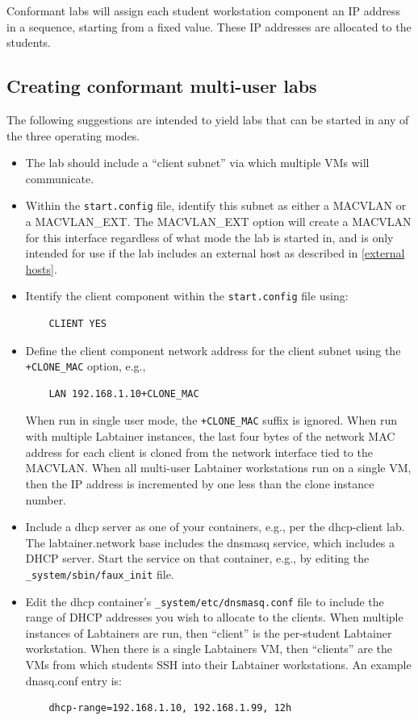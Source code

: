 \documentclass[12pt]{article}
\begin{document}
Conformant labs will assign each student workstation component an IP address in a sequence,
starting from a fixed value.  These IP addresses are allocated to the students.

\subsection{Creating conformant multi-user labs}
\label{conformant multi-user}
The following suggestions are intended to yield labs that can be started in any of
the three operating modes.

\begin{itemize}
\item The lab should include a ``client subnet'' via which multiple VMs will communicate.

\item Within the {\tt start.config} file, identify this subnet as either a MACVLAN or
a MACVLAN\_EXT.  The MACVLAN\_EXT
option will create a MACVLAN for this interface regardless of what mode the lab is started in,
and is only intended for use if the lab includes an external host as described in \ref{external hosts}.

\item Itentify the client component within the {\tt start.config} file using:
\begin{verbatim}
    CLIENT YES
\end{verbatim}

\item Define the client component network address for the client subnet using the
{\tt +CLONE\_MAC} option, e.g., 
\begin{verbatim}
    LAN 192.168.1.10+CLONE_MAC
\end{verbatim}
\noindent  When run in single user mode, the {\tt +CLONE\_MAC} suffix is ignored.  When run
with multiple Labtainer instances, the last four bytes of the network MAC address for
each client is cloned from the network interface tied to the MACVLAN.  When all multi-user
Labtainer workstations run on a single VM, then the IP address is incremented by one less
than the clone instance number.

\item Include a dhcp server as one of your containers, e.g., per the dhcp-client lab.  
The labtainer.network base includes the dnsmasq service, which includes a DHCP
server.  Start the service on that container, e.g., by editing the 
{\tt \_system/sbin/faux\_init}
file.  
\item Edit the dhcp container's {\tt \_system/etc/dnsmasq.conf} file to include the
range of DHCP addresses you wish to allocate to the clients.  When multiple instances
of Labtainers are run, then ``client'' is the per-student Labtainer workstation.  When
there is a single Labtainers VM, then ``clients'' are the VMs from which students
SSH into their Labtainer workstations.  An example dnasq.conf entry is:
\begin{verbatim}
    dhcp-range=192.168.1.10, 192.168.1.99, 12h
\end{verbatim}



\end{itemize}
\end{document}
